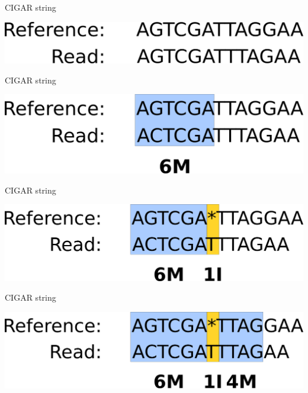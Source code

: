\documentclass{beamer}
\begin{document}
\begin{frame}{CIGAR string}
  \begin{center}
    \includegraphics[width=\linewidth, keepaspectratio]{pic/c1.png}
  \end{center}
\end{frame}

\begin{frame}{CIGAR string}
  \begin{center}
    \includegraphics[width=\linewidth, keepaspectratio]{pic/c2.png}
  \end{center}
\end{frame}

\begin{frame}{CIGAR string}
  \begin{center}
    \includegraphics[width=\linewidth, keepaspectratio]{pic/c3.png}
  \end{center}
\end{frame}

\begin{frame}{CIGAR string}
  \begin{center}
    \includegraphics[width=\linewidth, keepaspectratio]{pic/c4.png}
  \end{center}
\end{frame}
\end{document}
